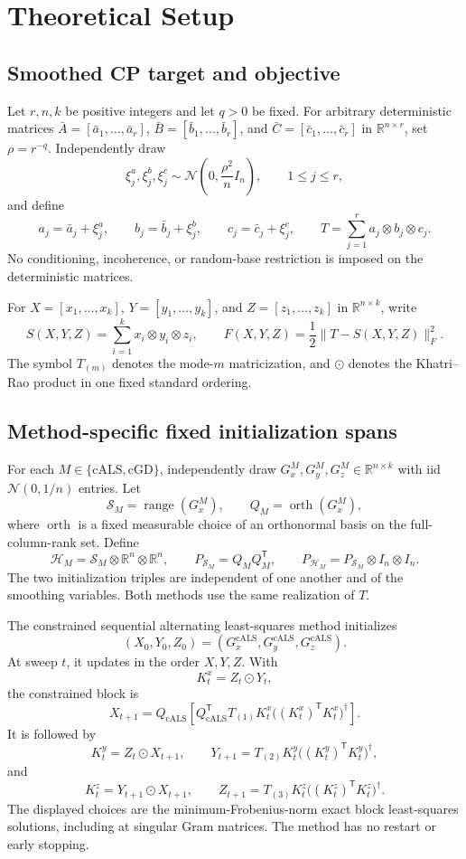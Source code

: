 \section{Theoretical Setup}

\subsection{Smoothed CP target and objective}

Let $r,n,k$ be positive integers and let $q>0$ be fixed.  For arbitrary
deterministic matrices
$\bar A=[\bar a_1,\ldots,\bar a_r]$,
$\bar B=[\bar b_1,\ldots,\bar b_r]$, and
$\bar C=[\bar c_1,\ldots,\bar c_r]$ in $\mathbb R^{n\times r}$, set
$\rho=r^{-q}$.  Independently draw
\[
 \xi_j^a,\xi_j^b,\xi_j^c\sim
 \mathcal N\!\left(0,\frac{\rho^2}{n}I_n\right),
 \qquad 1\le j\le r,
\]
and define
\[
 a_j=\bar a_j+\xi_j^a,\qquad
 b_j=\bar b_j+\xi_j^b,\qquad
 c_j=\bar c_j+\xi_j^c,
 \qquad
 T=\sum_{j=1}^r a_j\otimes b_j\otimes c_j.
\]
No conditioning, incoherence, or random-base restriction is imposed on the
deterministic matrices.

For $X=[x_1,\ldots,x_k]$, $Y=[y_1,\ldots,y_k]$, and
$Z=[z_1,\ldots,z_k]$ in $\mathbb R^{n\times k}$, write
\[
 S(X,Y,Z)=\sum_{i=1}^k x_i\otimes y_i\otimes z_i,
 \qquad
 F(X,Y,Z)=\frac12\|T-S(X,Y,Z)\|_F^2.
\]
The symbol $T_{(m)}$ denotes the mode-$m$ matricization, and $\odot$
denotes the Khatri--Rao product in one fixed standard ordering.

\subsection{Method-specific fixed initialization spans}

For each $M\in\{\mathrm{cALS},\mathrm{cGD}\}$, independently draw
$G_x^M,G_y^M,G_z^M\in\mathbb R^{n\times k}$ with iid
$\mathcal N(0,1/n)$ entries.  Let
\[
 \mathcal S_M=\operatorname{range}(G_x^M),
 \qquad
 Q_M=\operatorname{orth}(G_x^M),
\]
where $\operatorname{orth}$ is a fixed measurable choice of an orthonormal
basis on the full-column-rank set.  Define
\[
 \mathcal H_M=\mathcal S_M\otimes\mathbb R^n\otimes\mathbb R^n,
 \qquad
 P_{\mathcal S_M}=Q_MQ_M^{\mathsf T},
 \qquad
 P_{\mathcal H_M}=P_{\mathcal S_M}\otimes I_n\otimes I_n.
\]
The two initialization triples are independent of one another and of the
smoothing variables.  Both methods use the same realization of $T$.

The constrained sequential alternating least-squares method initializes
\[
 (X_0,Y_0,Z_0)=
 (G_x^{\mathrm{cALS}},G_y^{\mathrm{cALS}},G_z^{\mathrm{cALS}}).
\]
At sweep $t$, it updates in the order $X,Y,Z$.
With
\[
 K_t^x=Z_t\odot Y_t,
\]
the constrained block is
\[
 X_{t+1}=Q_{\mathrm{cALS}}
 \left[Q_{\mathrm{cALS}}^{\mathsf T}T_{(1)}K_t^x
 \bigl((K_t^x)^{\mathsf T}K_t^x\bigr)^\dagger\right].
\]
It is followed by
\[
 K_t^y=Z_t\odot X_{t+1},
 \qquad
 Y_{t+1}=T_{(2)}K_t^y
 \bigl((K_t^y)^{\mathsf T}K_t^y\bigr)^\dagger,
\]
and
\[
 K_t^z=Y_{t+1}\odot X_{t+1},
 \qquad
 Z_{t+1}=T_{(3)}K_t^z
 \bigl((K_t^z)^{\mathsf T}K_t^z\bigr)^\dagger.
\]
The displayed choices are the minimum-Frobenius-norm exact block
least-squares solutions, including at singular Gram matrices.  The method has
no restart or early stopping.

